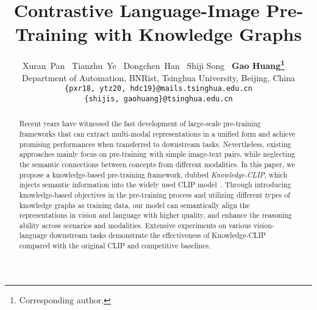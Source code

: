 \documentclass{article}
\title{Contrastive Language-Image Pre-Training with Knowledge Graphs}
\author{%
  Xuran~Pan~
  Tianzhu~Ye~
  Dongchen~Han~
  Shiji Song~
  \textbf{Gao Huang\thanks{Corresponding author.}~~}  \\ 
  Department of Automation, BNRist, Tsinghua University, Beijing, China\\
  \texttt{\{pxr18, ytz20, hdc19\}@mails.tsinghua.edu.cn} \\ \texttt{\{shijis, gaohuang\}@tsinghua.edu.cn}
}
\begin{document}
\maketitle


\begin{abstract}
Recent years have witnessed the fast development of large-scale pre-training frameworks that can extract multi-modal representations in a unified form and achieve promising performances when transferred to downstream tasks. Nevertheless, existing approaches mainly focus on pre-training with simple image-text pairs, while neglecting the semantic connections between concepts from different modalities. In this paper, we propose a knowledge-based pre-training framework, dubbed \textit{Knowledge-CLIP}, which injects semantic information into the widely used CLIP model~\cite{clip}. Through introducing knowledge-based objectives in the pre-training process and utilizing different types of knowledge graphs as training data, our model can semantically align the representations in vision and language with higher quality, and enhance the reasoning ability across scenarios and modalities. Extensive experiments on various vision-language downstream tasks demonstrate the effectiveness of Knowledge-CLIP compared with the original CLIP and competitive baselines.

\end{abstract}













\end{document}
